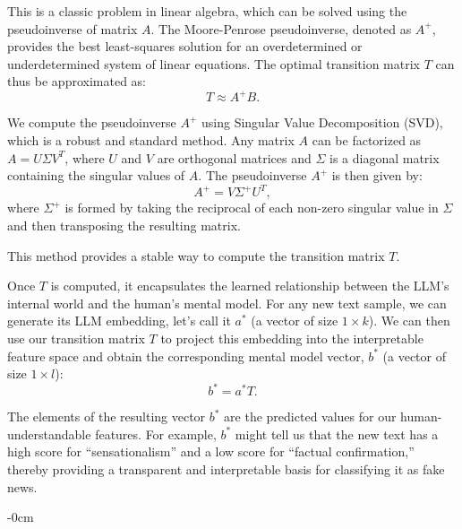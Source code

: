 \documentclass[ai,article,submit,pdftex,moreauthors]{Definitions/mdpi}
\begin{document}
This is a classic problem in linear algebra, which can be solved using the pseudoinverse of matrix $A$. The Moore-Penrose pseudoinverse, denoted as $A^+$, provides the best least-squares solution for an overdetermined or underdetermined system of linear equations. The optimal transition matrix $T$ can thus be approximated as:
\begin{equation}
T \approx A^+ B.
\end{equation}

We compute the pseudoinverse $A^+$ using Singular Value Decomposition (SVD), which is a robust and standard method. Any matrix $A$ can be factorized as $A = U\Sigma V^T$, where $U$ and $V$ are orthogonal matrices and $\Sigma$ is a diagonal matrix containing the singular values of $A$. The pseudoinverse $A^+$ is then given by:
\begin{equation}
A^+ = V\Sigma^+U^T,
\end{equation}
where $\Sigma^+$ is formed by taking the reciprocal of each non-zero singular value in $\Sigma$ and then transposing the resulting matrix.

This method provides a stable way to compute the transition matrix $T$.

Once $T$ is computed, it encapsulates the learned relationship between the LLM's internal world and the human's mental model. For any new text sample, we can generate its LLM embedding, let's call it $a^*$ (a vector of size $1 \times k$). We can then use our transition matrix $T$ to project this embedding into the interpretable feature space and obtain the corresponding mental model vector, $b^*$ (a vector of size $1 \times l$):
\begin{equation}
b^* = a^* T.
\end{equation}

The elements of the resulting vector $b^*$ are the predicted values for our human-understandable features. For example, $b^*$ might tell us that the new text has a high score for ``sensationalism'' and a low score for ``factual confirmation,'' thereby providing a transparent and interpretable basis for classifying it as fake news.




\begin{adjustwidth}{-\extralength}{0cm}



\PublishersNote{}

\end{adjustwidth}
\end{document}

